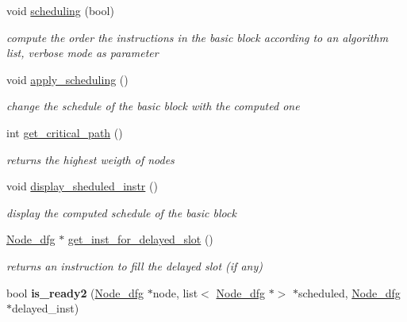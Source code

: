 \begin{DoxyCompactItemize}
\mbox{\label{class_dfg_a958e7f272272f47d4dfb1c106c0ae496}} 
void \mbox{\hyperlink{class_dfg_a958e7f272272f47d4dfb1c106c0ae496}{scheduling}} (bool)
\begin{DoxyCompactList}\small\item\em compute the order the instructions in the basic block according to an algorithm list, verbose mode as parameter \end{DoxyCompactList}\item 
\mbox{\label{class_dfg_a7e60854edb700328933377fff6025232}} 
void \mbox{\hyperlink{class_dfg_a7e60854edb700328933377fff6025232}{apply\+\_\+scheduling}} ()
\begin{DoxyCompactList}\small\item\em change the schedule of the basic block with the computed one \end{DoxyCompactList}\item 
\mbox{\label{class_dfg_a568f4d0d48fc38f8fcdc4944b8d48740}} 
int \mbox{\hyperlink{class_dfg_a568f4d0d48fc38f8fcdc4944b8d48740}{get\+\_\+critical\+\_\+path}} ()
\begin{DoxyCompactList}\small\item\em returns the highest weigth of nodes \end{DoxyCompactList}\item 
\mbox{\label{class_dfg_ad64fa53f2c4bf0b62b372a4fe4a4df98}} 
void \mbox{\hyperlink{class_dfg_ad64fa53f2c4bf0b62b372a4fe4a4df98}{display\+\_\+sheduled\+\_\+instr}} ()
\begin{DoxyCompactList}\small\item\em display the computed schedule of the basic block \end{DoxyCompactList}\item 
\mbox{\label{class_dfg_a2153f99097e7569a2682a8d6158bf019}} 
\mbox{\hyperlink{class_node__dfg}{Node\+\_\+dfg}} $\ast$ \mbox{\hyperlink{class_dfg_a2153f99097e7569a2682a8d6158bf019}{get\+\_\+inst\+\_\+for\+\_\+delayed\+\_\+slot}} ()
\begin{DoxyCompactList}\small\item\em returns an instruction to fill the delayed slot (if any) \end{DoxyCompactList}\item 
\mbox{\label{class_dfg_aa7e527abdf47214b6b27111476186fa2}} 
bool {\bfseries is\+\_\+ready2} (\mbox{\hyperlink{class_node__dfg}{Node\+\_\+dfg}} $\ast$node, list$<$ \mbox{\hyperlink{class_node__dfg}{Node\+\_\+dfg}} $\ast$$>$ $\ast$scheduled, \mbox{\hyperlink{class_node__dfg}{Node\+\_\+dfg}} $\ast$delayed\+\_\+inst)
\end{DoxyCompactItemize}


